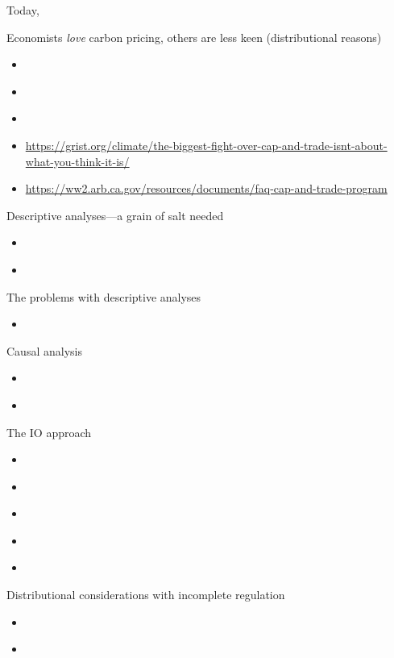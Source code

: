 Today, 




Economists \emph{love} carbon pricing, others are less keen (distributional reasons)
\begin{itemize}
    \item \cite{fischer2021green}
    \item \cite{meng2017using}
    \item \cite{borenstein2022carbon}
\end{itemize}

\begin{itemize}
    \item \url{https://grist.org/climate/the-biggest-fight-over-cap-and-trade-isnt-about-what-you-think-it-is/}
    \item \url{https://ww2.arb.ca.gov/resources/documents/faq-cap-and-trade-program}
\end{itemize}


\noindent Descriptive analyses---a grain of salt needed
\begin{itemize}
    \item \cite{cushing2018carbon}
    \item \cite{pastor2022up}
\end{itemize}

\noindent The problems with descriptive analyses
\begin{itemize}
    \item \cite{hernandez2022importance}
\end{itemize}

\noindent Causal analysis
\begin{itemize}
    \item \cite{hernandez2023environmental}
    \item \cite{hernandez2021environmental}
\end{itemize}

\noindent The IO approach
\begin{itemize}
    \item \cite{weber2021dynamic}
    \item \cite{gowrisankaran2022policy}
    \item \cite{abito2022role}
    \item \cite{cullen2017}
    \item \cite{cullen2015}
\end{itemize}

\noindent Distributional considerations with incomplete regulation
\begin{itemize}
    \item \cite{hernandez2022distributional}
    \item \cite{tanaka2022north}
\end{itemize}


